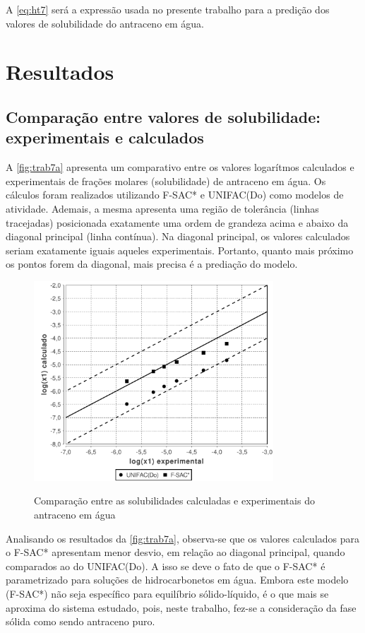 A \autoref{eq:ht7} será a expressão usada no presente trabalho para a predição
dos valores de solubilidade do antraceno em água.

\section{Resultados}

\subsection{Comparação entre valores de solubilidade: experimentais e
calculados}

A \autoref{fig:trab7a} apresenta um comparativo entre os valores logarítmos
calculados e experimentais de frações molares (solubilidade) de antraceno em
água. Os cálculos foram realizados utilizando F-SAC* e UNIFAC(Do) como modelos
de atividade. Ademais, a mesma apresenta uma região de tolerância (linhas tracejadas)
posicionada exatamente uma ordem de grandeza acima e abaixo da diagonal 
principal (linha contínua). Na diagonal principal, os valores calculados seriam
exatamente iguais aqueles experimentais. Portanto, quanto mais próximo os pontos
forem da diagonal, mais precisa é a prediação do modelo.

\clearpage
  
\begin{figure}
\centering
{\includegraphics[width=0.8\textwidth]{img/trab7a.pdf}} 
\caption{Comparação entre as solubilidades calculadas e experimentais do
antraceno em água}
\label{fig:trab7a}
\end{figure}

Analisando os resultados da \autoref{fig:trab7a}, observa-se que os valores calculados
para o F-SAC* apresentam menor desvio, em relação ao diagonal principal, quando
comparados ao do UNIFAC(Do). A isso se deve o fato de que o F-SAC* é parametrizado 
para soluções de hidrocarbonetos em água. Embora este modelo (F-SAC*) 
não seja específico para equilíbrio sólido-líquido, é o que mais se aproxima 
do sistema estudado, pois, neste trabalho, fez-se a consideração da fase sólida 
como sendo antraceno puro.
	
